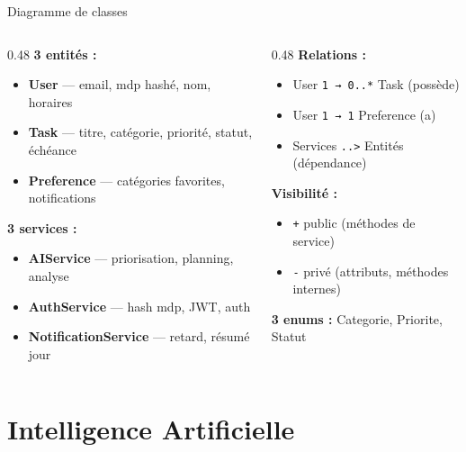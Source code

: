 \documentclass[aspectratio=169, 10pt]{beamer}
\begin{document}
\begin{frame}{Diagramme de classes}
\small
\begin{columns}[T]
\begin{column}{0.48\textwidth}
\textbf{\textcolor{secondary}{3 entités :}}
\begin{itemize}\footnotesize
    \item \textbf{User} — email, mdp hashé, nom, horaires
    \item \textbf{Task} — titre, catégorie, priorité, statut, échéance
    \item \textbf{Preference} — catégories favorites, notifications
\end{itemize}
\vspace{0.2cm}
\textbf{\textcolor{secondary}{3 services :}}
\begin{itemize}\footnotesize
    \item \textbf{AIService} — priorisation, planning, analyse
    \item \textbf{AuthService} — hash mdp, JWT, auth
    \item \textbf{NotificationService} — retard, résumé jour
\end{itemize}
\end{column}
\begin{column}{0.48\textwidth}
\textbf{\textcolor{secondary}{Relations :}}
\begin{itemize}\footnotesize
    \item User \texttt{1 → 0..*} Task (possède)
    \item User \texttt{1 → 1} Preference (a)
    \item Services \texttt{..>} Entités (dépendance)
\end{itemize}
\vspace{0.2cm}
\textbf{\textcolor{secondary}{Visibilité :}}
\begin{itemize}\footnotesize
    \item \texttt{+} public (méthodes de service)
    \item \texttt{-} privé (attributs, méthodes internes)
\end{itemize}
\vspace{0.2cm}
\textbf{\textcolor{secondary}{3 enums :}}
\footnotesize Categorie, Priorite, Statut
\end{column}
\end{columns}
\end{frame}

\section{Intelligence Artificielle}
\end{document}
